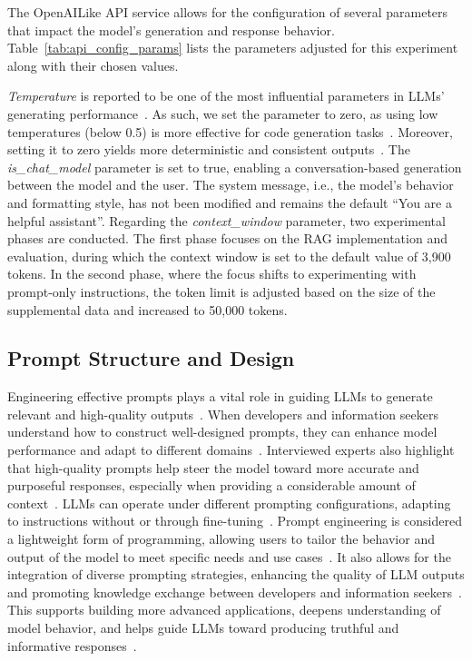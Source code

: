\documentclass{DESSThesis}
\begin{document}
The OpenAILike API service allows for the configuration of several parameters that impact the model's generation and response behavior. Table~\ref{tab:api_config_params} lists the parameters adjusted for this experiment along with their chosen values. 

\emph{Temperature} is reported to be one of the most influential parameters in LLMs' generating performance~\cite{arora2024optimizinglargelanguagemodel}. 
As such, we set the parameter to zero, as using low temperatures (below 0.5) is more effective for code generation tasks~\cite{arora2024optimizinglargelanguagemodel,10.1145/3697010}. Moreover, setting it to zero yields more deterministic and consistent outputs~\cite{10.1145/3697010}. The \emph{is\_chat\_model} parameter is set to true, enabling a conversation-based generation between the model and the user. The system message, i.e., the model's behavior and formatting style, has not been modified and remains the default \enquote{You are a helpful assistant}. Regarding the \emph{context\_window} parameter, two experimental phases are conducted. The first phase focuses on the RAG implementation and evaluation, during which the context window is set to the default value of 3,900 tokens. In the second phase, where the focus shifts to experimenting with prompt-only instructions, the token limit is adjusted based on the size of the supplemental data and increased to 50,000 tokens.

\subsection{Prompt Structure and Design}

Engineering effective prompts plays a vital role in guiding LLMs to generate relevant and high-quality outputs~\cite{10.1007/978-981-99-7962-2_30}. When developers and information seekers understand how to construct well-designed prompts, they can enhance model performance and adapt to different domains~\cite{10.1007/978-981-99-7962-2_30}. Interviewed experts also highlight that high-quality prompts help steer the model toward more accurate and purposeful responses, especially when providing a considerable amount of context~\cite{simon2023promptguidelines}.
LLMs can operate under different prompting configurations, adapting to instructions without or through fine-tuning~\cite{naveed2024comprehensiveoverviewlargelanguage}.
Prompt engineering is considered a lightweight form of programming, allowing users to tailor the behavior and output of the model to meet specific needs and use cases~\cite{10.1007/978-981-99-7962-2_30}. It also allows for the integration of diverse prompting strategies, enhancing the quality of LLM outputs and promoting knowledge exchange between developers and information seekers~\cite{10.1007/978-981-99-7962-2_30}. This supports building more advanced applications, deepens understanding of model behavior, and helps guide LLMs toward producing truthful and informative responses~\cite{10.1007/978-981-99-7962-2_30}.
\end{document}
